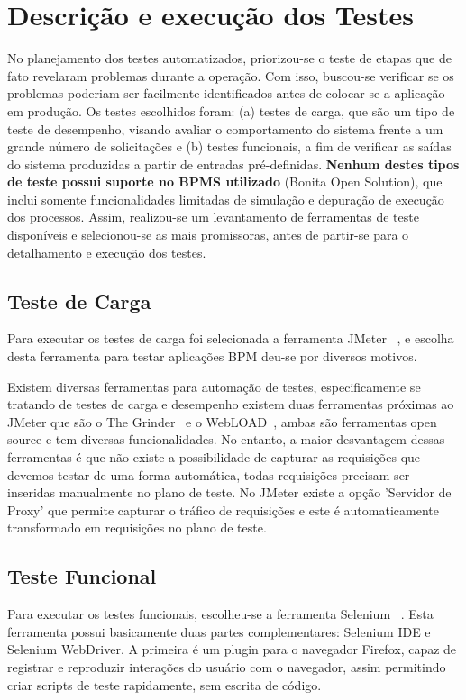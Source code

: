 \documentclass[12pt]{article}
\begin{document}
\section{Descrição e execução dos Testes}

No planejamento dos testes automatizados, priorizou-se o teste de  etapas que de fato revelaram problemas durante a operação. Com isso, buscou-se verificar se os problemas poderiam ser facilmente identificados antes de colocar-se a aplicação em produção. Os testes escolhidos foram: (a) testes de carga, que são um tipo de teste de desempenho, visando avaliar o comportamento do sistema frente a um grande número de solicitações e (b) testes funcionais, a fim de verificar as saídas do sistema produzidas a partir de entradas pré-definidas. \textbf{Nenhum destes tipos de teste possui suporte no BPMS utilizado} (Bonita Open Solution), que inclui somente funcionalidades limitadas de simulação e depuração de execução dos processos. Assim, realizou-se um levantamento de ferramentas de teste disponíveis e selecionou-se as mais promissoras, antes de partir-se para o detalhamento e execução dos testes.

\subsection{Teste de Carga}
Para executar os testes de carga foi selecionada a ferramenta JMeter ~\cite{JMETER}, e escolha desta ferramenta para testar aplicações BPM deu-se por diversos motivos.

Existem diversas ferramentas para automação de testes, especificamente se tratando de testes de carga e desempenho existem duas ferramentas próximas ao JMeter que são o The Grinder~\cite{GRINDER} e o WebLOAD~\cite{WEBLOAD}, ambas são ferramentas open source e tem diversas funcionalidades. No entanto, a maior desvantagem dessas ferramentas é que não existe a possibilidade de capturar as requisições que devemos testar de uma forma automática, todas requisições precisam ser inseridas manualmente no plano de teste. No JMeter existe a opção 'Servidor de Proxy' que permite capturar o tráfico de requisições e este é automaticamente transformado em requisições no plano de teste.


\subsection{Teste Funcional}
Para executar os testes funcionais, escolheu-se a ferramenta Selenium ~\cite{SELENIUM}. Esta ferramenta possui basicamente duas partes complementares: Selenium IDE e Selenium WebDriver. A primeira é um plugin para o navegador Firefox, capaz de registrar e reproduzir interações do usuário com o navegador, assim permitindo criar scripts de teste rapidamente, sem escrita de código.
\end{document}
